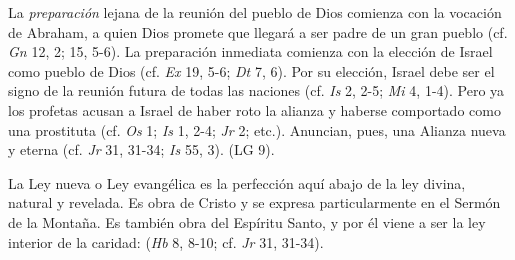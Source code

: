 \begin{ccebody}
 La \textit{preparación} lejana de la reunión del pueblo de Dios comienza con la vocación de Abraham, a quien Dios promete que llegará a ser padre de un gran pueblo (cf. \textit{Gn} 12, 2; 15, 5-6). La preparación inmediata comienza con la elección de Israel como pueblo de Dios (cf. \textit{Ex} 19, 5-6; \textit{Dt} 7, 6). Por su elección, Israel debe ser el signo de la reunión futura de todas las naciones (cf. \textit{Is} 2, 2-5; \textit{Mi} 4, 1-4). Pero ya los profetas acusan a Israel de haber roto la alianza y haberse comportado como una prostituta (cf. \textit{Os} 1; \textit{Is} 1, 2-4; \textit{Jr} 2; etc.). Anuncian, pues, una Alianza nueva y eterna (cf. \textit{Jr} 31, 31-34; \textit{Is} 55, 3).  (LG 9).


 La Ley nueva o Ley evangélica es la perfección aquí abajo de la ley divina, natural y revelada. Es obra de Cristo y se expresa particularmente en el Sermón de la Montaña. Es también obra del Espíritu Santo, y por él viene a ser la ley interior de la caridad:  (\textit{Hb} 8, 8-10; cf. \textit{Jr} 31, 31-34).
\end{ccebody}

